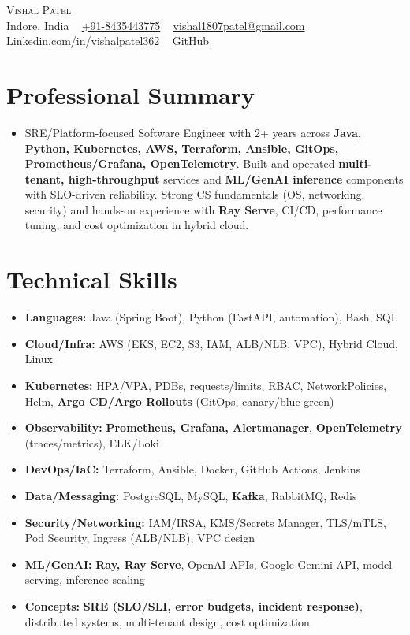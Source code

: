 \documentclass[letterpaper,11pt]{article}
\begin{document}
\begin{center}
    {\LARGE \scshape Vishal Patel} \\ \vspace{1pt}
    Indore, India ~
    \href{tel:+918435443775}{+91-8435443775} ~
    \href{mailto:vishal1807patel@gmail.com}{vishal1807patel@gmail.com} ~
    \href{https://www.linkedin.com/in/vishalpatel362}{Linkedin.com/in/vishalpatel362} ~
    \href{https://github.com/vishal362patel}{GitHub}
\end{center}

\section{Professional Summary}
\begin{itemize}[leftmargin=0.15in,label={},topsep=0pt,noitemsep]
    \item SRE/Platform-focused Software Engineer with 2+ years across \textbf{Java, Python, Kubernetes, AWS, Terraform, Ansible, GitOps, Prometheus/Grafana, OpenTelemetry}. Built and operated \textbf{multi-tenant, high-throughput} services and \textbf{ML/GenAI inference} components with SLO-driven reliability. Strong CS fundamentals (OS, networking, security) and hands-on experience with \textbf{Ray Serve}, CI/CD, performance tuning, and cost optimization in hybrid cloud.
\end{itemize}

\section{Technical Skills}
\begin{itemize}[leftmargin=0.15in,label={},topsep=0pt,noitemsep]
    \item \textbf{Languages:} Java (Spring Boot), Python (FastAPI, automation), Bash, SQL
    \item \textbf{Cloud/Infra:} AWS (EKS, EC2, S3, IAM, ALB/NLB, VPC), Hybrid Cloud, Linux
    \item \textbf{Kubernetes:} HPA/VPA, PDBs, requests/limits, RBAC, NetworkPolicies, Helm, \textbf{Argo CD/Argo Rollouts} (GitOps, canary/blue-green)
    \item \textbf{Observability:} \textbf{Prometheus, Grafana, Alertmanager}, \textbf{OpenTelemetry} (traces/metrics), ELK/Loki
    \item \textbf{DevOps/IaC:} Terraform, Ansible, Docker, GitHub Actions, Jenkins
    \item \textbf{Data/Messaging:} PostgreSQL, MySQL, \textbf{Kafka}, RabbitMQ, Redis
    \item \textbf{Security/Networking:} IAM/IRSA, KMS/Secrets Manager, TLS/mTLS, Pod Security, Ingress (ALB/NLB), VPC design
    \item \textbf{ML/GenAI:} \textbf{Ray, Ray Serve}, OpenAI APIs, Google Gemini API, model serving, inference scaling
    \item \textbf{Concepts:} \textbf{SRE (SLO/SLI, error budgets, incident response)}, distributed systems, multi-tenant design, cost optimization
\end{itemize}
\end{document}
